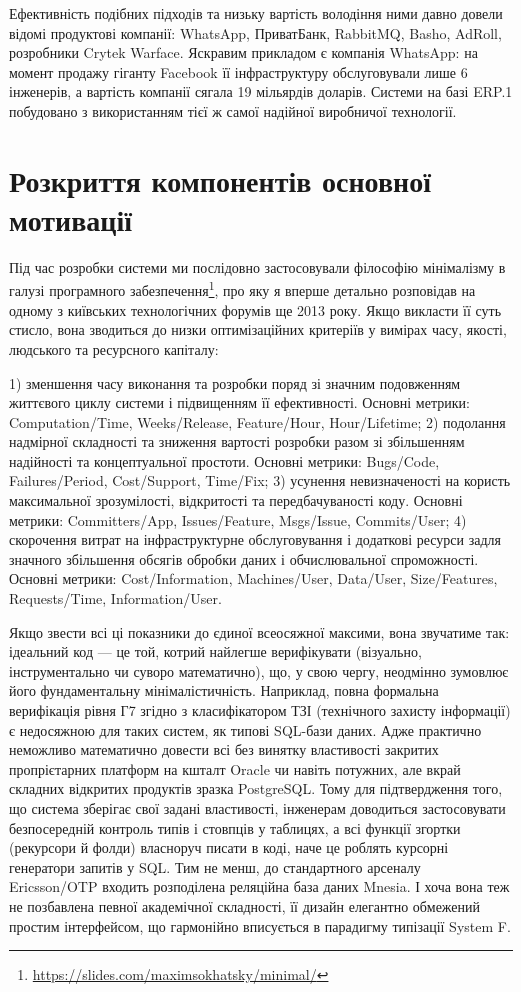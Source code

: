 Ефективність подібних підходів та низьку вартість володіння ними давно довели відомі продуктові компанії: WhatsApp, ПриватБанк, RabbitMQ, Basho, AdRoll, розробники Crytek Warface. Яскравим прикладом є компанія WhatsApp: на момент продажу гіганту Facebook її інфраструктуру обслуговували лише 6 інженерів, а вартість компанії сягала 19 мільярдів доларів. Системи на базі ERP.1 побудовано з використанням тієї ж самої надійної виробничої технології.


\section*{Розкриття компонентів основної мотивації}

Під час розробки системи ми послідовно застосовували філософію мінімалізму в галузі програмного забезпечення\footnote{\url{https://slides.com/maximsokhatsky/minimal/}}, про яку я вперше детально розповідав на одному з київських технологічних форумів ще 2013 року. Якщо викласти її суть стисло, вона зводиться до низки оптимізаційних критеріїв у вимірах часу, якості, людського та ресурсного капіталу:

1) зменшення часу виконання та розробки поряд зі значним подовженням життєвого циклу системи і підвищенням її ефективності. Основні метрики: Computation/Time, Weeks/Release, Feature/Hour, Hour/Lifetime;
2) подолання надмірної складності та зниження вартості розробки разом зі збільшенням надійності та концептуальної простоти. Основні метрики: Bugs/Code, Failures/Period, Cost/Support, Time/Fix;
3) усунення невизначеності на користь максимальної зрозумілості, відкритості та передбачуваності коду. Основні метрики: Committers/App, Issues/Feature, Msgs/Issue, Commits/User;
4) скорочення витрат на інфраструктурне обслуговування і додаткові ресурси задля значного збільшення обсягів обробки даних і обчислювальної спроможності. Основні метрики: Cost/Information, Machines/User, Data/User, Size/Features, Requests/Time, Information/User.

Якщо звести всі ці показники до єдиної всеосяжної максими, вона звучатиме так: ідеальний код — це той, котрий найлегше верифікувати (візуально, інструментально чи суворо математично), що, у свою чергу, неодмінно зумовлює його фундаментальну мінімалістичність. Наприклад, повна формальна верифікація рівня Г7 згідно з класифікатором ТЗІ (технічного захисту інформації) є недосяжною для таких систем, як типові SQL-бази даних. Адже практично неможливо математично довести всі без винятку властивості закритих пропрієтарних платформ на кшталт Oracle чи навіть потужних, але вкрай складних відкритих продуктів зразка PostgreSQL. Тому для підтвердження того, що система зберігає свої задані властивості, інженерам доводиться застосовувати безпосередній контроль типів і стовпців у таблицях, а всі функції згортки (рекурсори й фолди) власноруч писати в коді, наче це роблять курсорні генератори запитів у SQL. Тим не менш, до стандартного арсеналу Ericsson/OTP входить розподілена реляційна база даних Mnesia. І хоча вона теж не позбавлена певної академічної складності, її дизайн елегантно обмежений простим інтерфейсом, що гармонійно вписується в парадигму типізації System F.

